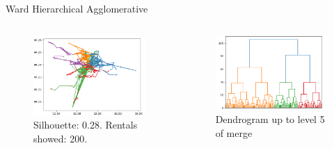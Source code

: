 \documentclass{beamer}
\begin{document}
\begin{frame}{Ward Hierarchical Agglomerative}
\begin{columns}[t, onlytextwidth]
	\begin{figure}[bt]
		\centering
		\includegraphics[width=\textwidth]{ward-agglomerative-plot}
		\caption{Silhouette: 0.28. Rentals showed: 200.}
		\label{fig:ward-agglomerative-line}
	\end{figure}
	\begin{figure}[bt]
		\centering
		\includegraphics[width=\textwidth]{ward-agglomerative-dendrogram}
		\caption{Dendrogram up to level 5 of merge}
		\label{fig:ward-agglomerative-dendrogram}
	\end{figure}
\end{columns}
\end{frame}
\end{document}
